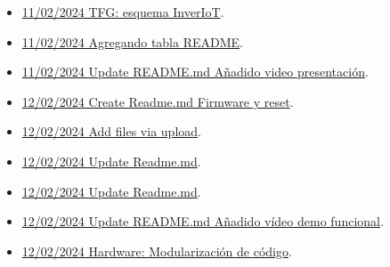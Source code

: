 \begin{itemize}
\item \href{https://github.com/JLCaballeroMQ/Proyecto_TFG_UBU_23_24/tree/e3b166c487535c7517a73d0febd8a3368cf6d55c}{11/02/2024 TFG: esquema InverIoT}.
\item \href{https://github.com/JLCaballeroMQ/Proyecto_TFG_UBU_23_24/tree/806e8913dad0fa7843022204bf92b0d23204e13a}{11/02/2024 Agregando tabla README}.
\item \href{https://github.com/JLCaballeroMQ/Proyecto_TFG_UBU_23_24/tree/3f619b7b9b5b534cefbb7268f343bf59594ad92d}{11/02/2024 Update README.md Añadido video presentación}.
\item \href{https://github.com/JLCaballeroMQ/Proyecto_TFG_UBU_23_24/tree/7c7fe0d75239ff9424bb6d50d05be48e424e4bab}{12/02/2024 Create Readme.md Firmware y reset}.
\item \href{https://github.com/JLCaballeroMQ/Proyecto_TFG_UBU_23_24/tree/cf57a10e4a866ed56b990896c38a2dcd0a948271}{12/02/2024 Add files via upload}.
\item \href{https://github.com/JLCaballeroMQ/Proyecto_TFG_UBU_23_24/tree/019eff1d647ae16a32a191e48c32e20e17225a8d}{12/02/2024 Update Readme.md}.
\item \href{https://github.com/JLCaballeroMQ/Proyecto_TFG_UBU_23_24/tree/86aea049545adaa8cb45f71e9adcb9e3784e5032}{12/02/2024 Update Readme.md}.
\item \href{https://github.com/JLCaballeroMQ/Proyecto_TFG_UBU_23_24/tree/9c6389326635941777a9b490c23292fbcddbfcc0}{12/02/2024 Update README.md Añadido vídeo demo funcional}.
\item \href{https://github.com/JLCaballeroMQ/Proyecto_TFG_UBU_23_24/tree/ce14dd291215a23fde71d61bc5c1cbdb6fd6f924}{12/02/2024 Hardware: Modularización de código}.
\end{itemize}

